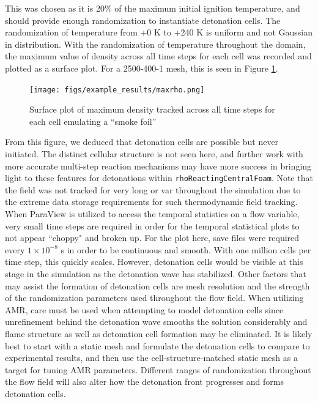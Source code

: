 \noindent This was chosen as it is 20\% of the maximum initial ignition temperature, and should provide enough randomization to instantiate detonation cells. The randomization of temperature from +0 K to +240 K is uniform and not Gaussian in distribution. With the randomization of temperature throughout the domain, the maximum value of density across all time steps for each cell was recorded and plotted as a surface plot. 
For a 2500-400-1 mesh, this is seen in Figure \ref{fig:maxrho}.
\begin{figure}[h]
\centering
\texttt{[image: figs/example\_results/maxrho.png]}
\caption{Surface plot of maximum density tracked across all time steps for each cell emulating a ``smoke foil''}
\label{fig:maxrho}
\end{figure}
From this figure, we deduced that detonation cells are possible but never initiated. The distinct cellular structure is not seen here, and further work with more accurate multi-step reaction mechanisms may have more success in bringing light to these features for detonations within \verb|rhoReactingCentralFoam|. Note that the field was not tracked for very long or var throughout the simulation due to the extreme data storage requirements for such thermodynamic field tracking. When ParaView is utilized to access the temporal statistics on a flow variable, very small time steps are required in order for the temporal statistical plots to not appear ``choppy" and broken up. For the plot here, save files were required every \(1 \times 10^{ - 8}\) s in order to be continuous and smooth. With one million cells per time step, this quickly scales. However, detonation cells would be visible at this stage in the simulation as the detonation wave has stabilized. Other factors that may assist the formation of detonation cells are mesh resolution and the strength of the randomization parameters used throughout the flow field. When utilizing AMR, care must be used when attempting to model detonation cells since unrefinement behind the detonation wave smooths the solution considerably and flame structure as well as detonation cell formation may be eliminated. It is likely best to start with a static mesh and formulate the detonation cells to compare to experimental results, and then use the cell-structure-matched static mesh as a target for tuning AMR parameters. Different ranges of randomization throughout the flow field will also alter how the detonation front progresses and forms detonation cells. 



